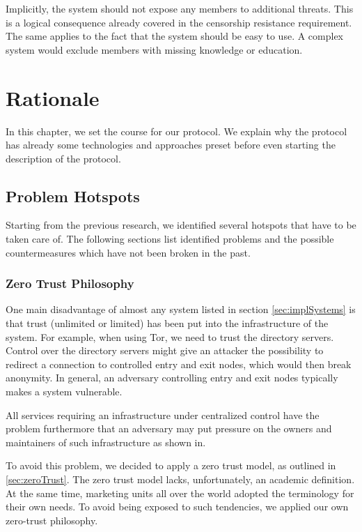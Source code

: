 Implicitly, the system should not expose any members to additional threats. This is a logical consequence already covered in the censorship resistance requirement. The same applies to the fact that the system should be easy to use. A complex system would exclude members with missing knowledge or education. 

\chapter{Rationale\label{sec:rationale}}
In this chapter, we set the course for our protocol. We explain why the protocol has already some technologies and approaches preset before even starting the description of the protocol.

\section{Problem Hotspots}
Starting from the previous research, we identified several hotspots that have to be taken care of. The following sections list identified problems and the possible countermeasures which have not been broken in the past.

\subsection{Zero Trust Philosophy}
One main disadvantage of almost any system listed in section \ref{sec:implSystems} is that trust (unlimited or limited) has been put into the infrastructure of the system. For example, when using Tor, we need to trust the directory servers. Control over the directory servers might give an attacker the possibility to redirect a connection to controlled entry and exit nodes, which would then break anonymity. In general, an adversary controlling entry and exit nodes typically makes a system vulnerable. 

All services requiring an infrastructure under centralized control have the problem furthermore that an adversary may put pressure on the owners and maintainers of such infrastructure as shown in\cite{penetClosure}. 

To avoid this problem, we decided to apply a zero trust model, as outlined in \ref{sec:zeroTrust}. The zero trust model lacks, unfortunately, an academic definition. At the same time, marketing units all over the world adopted the terminology for their own needs. To avoid being exposed to such tendencies, we applied our own zero-trust philosophy.

